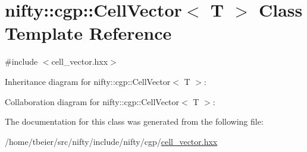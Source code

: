 \hypertarget{classnifty_1_1cgp_1_1CellVector}{}\section{nifty\+:\+:cgp\+:\+:Cell\+Vector$<$ T $>$ Class Template Reference}
\label{classnifty_1_1cgp_1_1CellVector}


{\ttfamily \#include $<$cell\+\_\+vector.\+hxx$>$}



Inheritance diagram for nifty\+:\+:cgp\+:\+:Cell\+Vector$<$ T $>$\+:


Collaboration diagram for nifty\+:\+:cgp\+:\+:Cell\+Vector$<$ T $>$\+:


The documentation for this class was generated from the following file\+:\begin{DoxyCompactItemize}
\item 
/home/tbeier/src/nifty/include/nifty/cgp/\hyperlink{cell__vector_8hxx}{cell\+\_\+vector.\+hxx}\end{DoxyCompactItemize}
